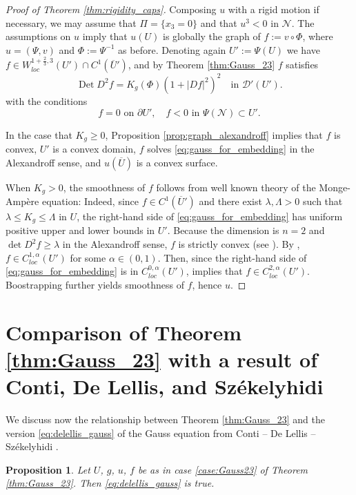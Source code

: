 \documentclass[12pt]{article}
\newcommand{\Det}{\operatorname{Det}}
\theoremstyle{plain}
\newtheorem{proposition}[theorem]{Proposition}
\numberwithin{equation}{section}
\begin{document}
\begin{proof}[Proof of Theorem \ref{thm:rigidity_caps}]
    Composing $u$ with a rigid motion if necessary, we may assume that $\Pi = \{x_3=0\}$ and that $u^3 < 0$ in $\mathcal{N}$. The assumptions on $u$ imply that $u(U)$ is globally the graph of $f:= v\circ \Phi$, where $u = (\Psi, v)$ and $\Phi := \Psi^{-1}$ as before. Denoting again $U' := \Psi(U)$ we have $f \in W^{1+\frac23,3}_{loc}(U') \cap C^1(\overline U')$, and by Theorem \ref{thm:Gauss_23} $f$ satisfies
    \begin{equation} \label{eq:gauss_for_embedding}
        \Det D^2 f = K_g(\Phi)(1+|Df|^2)^2 \quad \text{in } \mathcal{D}'(U').
    \end{equation}
    with the conditions
    \begin{equation*}
        f = 0 \text{ on } \partial U', \quad f < 0 \text{ in } \Psi(\mathcal{N}) \subset U'.
    \end{equation*}
    
    In the case that $K_g \geq 0$, Proposition \ref{prop:graph_alexandroff} implies that $f$ is convex, $U'$ is a convex domain, $f$ solves \eqref{eq:gauss_for_embedding} in the Alexandroff sense, and $u(\overline U)$ is a convex surface.
    
    When $K_g > 0$, the smoothness of $f$ follows from well known theory of the Monge-Amp\`ere equation: Indeed, since $f \in C^1(\overline U')$ and there exist $\lambda, \Lambda > 0$ such that $\lambda \leq K_g \leq \Lambda$ in $U$, the right-hand side of \eqref{eq:gauss_for_embedding} has uniform positive upper and lower bounds in $U'$. Because the dimension is $n=2$ and $\det D^2f \geq \lambda$ in the Alexandroff sense, $f$ is strictly convex (see \cite{alexandroff}). By \cite[Theorem 2]{caffarelli_91}, $f \in C^{1,\alpha}_{loc}(U')$ for some $\alpha \in (0,1)$. Then, since the right-hand side of \eqref{eq:gauss_for_embedding} is in $C^{0,\alpha}_{loc}(U')$, \cite[Theorem 2]{caffarelli_90} implies that $f \in C^{2,\alpha}_{loc}(U')$. Boostrapping further yields smoothness of $f$, hence $u$.
\end{proof}

\appendix
\section{Comparison of Theorem \ref{thm:Gauss_23} with a result of Conti, De Lellis, and Székelyhidi} \label{sec:delellis_vs_MA}

We discuss now the relationship between Theorem \ref{thm:Gauss_23} and the version \eqref{eq:delellis_gauss} of the Gauss equation from Conti -- De Lellis -- Székelyhidi \cite[Proposition 6]{conti_deLellis_szekelyhidi_12}. 
\begin{proposition} \label{prop:CdLS_vs_Gauss}
    Let $U$, $g$, $u$, $f$ be as in case \eqref{case:Gauss23} of Theorem \ref{thm:Gauss_23}. Then \eqref{eq:delellis_gauss} is true.
\end{proposition}
\end{document}
